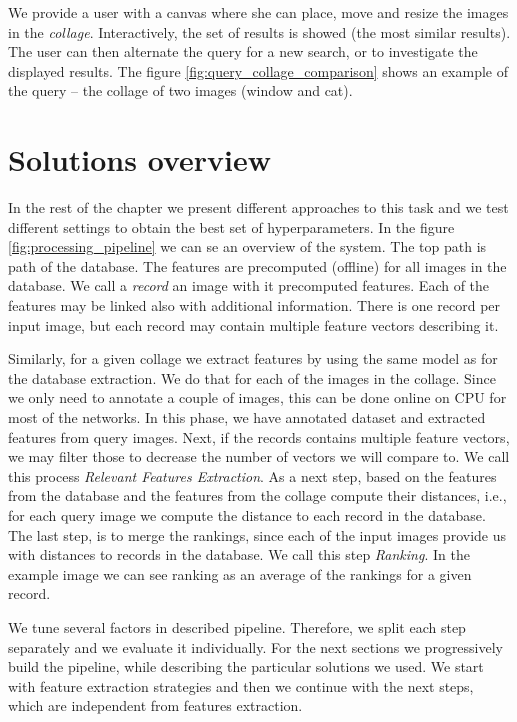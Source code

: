 We provide a user with a canvas where she can place, move and resize the images in the \emph{collage}. Interactively, the set of results is showed (the most similar results). The user can then alternate the query for a new search, or to investigate the displayed results. The figure \ref{fig:query_collage_comparison} shows an example of the query -- the collage of two images (window and cat). 

\section{Solutions overview}

In the rest of the chapter we present different approaches to this task and we test different settings to obtain the best set of hyperparameters. In the figure \ref{fig:processing_pipeline} we can se an overview of the system. The top path is path of the database. The features are precomputed (offline) for all images in the database. We call a \emph{record} an image with it precomputed features. Each of the features may be linked also with additional information. There is one record per input image, but each record may contain multiple feature vectors describing it.

Similarly, for a given collage we extract features by using the same model as for the database extraction. We do that for each of the images in the collage. Since we only need to annotate a couple of images, this can be done online on CPU for most of the networks. In this phase, we have annotated dataset and extracted features from query images. Next, if the records contains multiple feature vectors, we may filter those to decrease the number of vectors we will compare to. We call this process \emph{Relevant Features Extraction}. As a next step, based on the features from the database and the features from the collage compute their distances, i.e., for each query image we compute the distance to each record in the database. The last step, is to merge the rankings, since each of the input images provide us with distances to records in the database. We call this step \emph{Ranking}. In the example image we can see ranking as an average of the rankings for a given record.

We tune several factors in described pipeline. Therefore, we split each step separately and we evaluate it individually. For the next sections we progressively build the pipeline, while describing the particular solutions we used. We start with feature extraction strategies and then we continue with the next steps, which are independent from features extraction.

